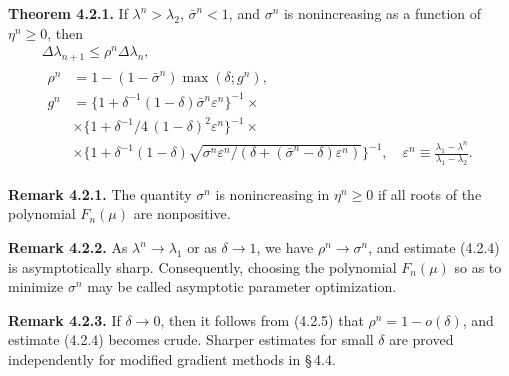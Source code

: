 \documentclass[11pt,oneside]{book}
\begin{document}
\textbf{Theorem 4.2.1.} If $\lambda^n > \lambda_2$, $\bar{\sigma}^n < 1$, and $\sigma^n$ is nonincreasing as a function of $\eta^n \geqslant 0$, then
\begin{gather*}
\Delta\lambda_{n+1} \leqslant \rho^n \Delta\lambda_n, \tag{4.2.4} \\
\begin{aligned}
\rho^n &= 1 - (1 - \bar{\sigma}^n) \max(\delta; g^n), \\
g^n &= \{ 1 + \delta^{-1} (1 - \delta) \bar{\sigma}^n \varepsilon^n \}^{-1} \times \\
&\times \{ 1 + \delta^{-1} / 4 \, (1 - \delta)^2 \varepsilon^n \}^{-1} \times \\
&\times \{ 1 + \delta^{-1} (1 - \delta) \sqrt{ \sigma^n \varepsilon^n / (\delta + (\bar{\sigma}^n - \delta) \varepsilon^n) } \}^{-1}, \quad \varepsilon^n \equiv \frac{\lambda_1 - \lambda^n}{\lambda_1 - \lambda_2}. %
\end{aligned}
\tag{4.2.5}
\end{gather*}

\textbf{Remark 4.2.1.} The quantity $\sigma^n$ is nonincreasing in $\eta^n \geqslant 0$ if all roots of the polynomial $F_n(\mu)$ are nonpositive.

\textbf{Remark 4.2.2.} As $\lambda^n \to \lambda_1$ or as $\delta \to 1$, we have $\rho^n \to \sigma^n$, and estimate (4.2.4) is asymptotically sharp. Consequently, choosing the polynomial $F_n(\mu)$ so as to minimize $\sigma^n$ may be called asymptotic parameter optimization. %

\textbf{Remark 4.2.3.} If $\delta \to 0$, then it follows from (4.2.5) that $\rho^n = 1 - o(\delta)$, and estimate (4.2.4) becomes crude. Sharper estimates for small $\delta$ are proved independently for modified gradient methods in \S\,4.4. %
\end{document}
